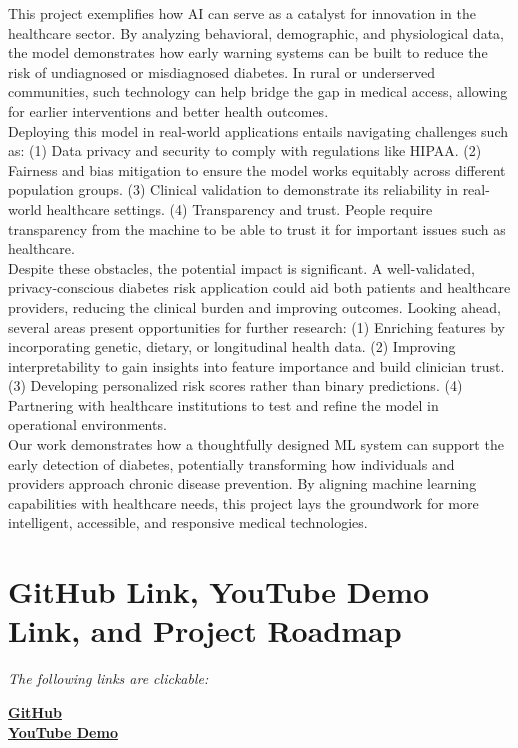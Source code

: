 \documentclass[conference]{IEEEtran}
\begin{document}
This project exemplifies how AI can serve as a catalyst for innovation in the healthcare sector. By analyzing behavioral, demographic, and physiological data, the model demonstrates how early warning systems can be built to reduce the risk of undiagnosed or misdiagnosed diabetes. In rural or underserved communities, such technology can help bridge the gap in medical access, allowing for earlier interventions and better health outcomes. \\

Deploying this model in real-world applications entails navigating challenges such as: (1) Data privacy and security to comply with regulations like HIPAA. (2) Fairness and bias mitigation to ensure the model works equitably across different population groups. (3) Clinical validation to demonstrate its reliability in real-world healthcare settings. (4) Transparency and trust. People require transparency from the machine to be able to trust it for important issues such as healthcare. \\

Despite these obstacles, the potential impact is significant. A well-validated, privacy-conscious diabetes risk application could aid both patients and healthcare providers, reducing the clinical burden and improving outcomes. Looking ahead, several areas present opportunities for further research: (1) Enriching features by incorporating genetic, dietary, or longitudinal health data. (2) Improving interpretability to gain insights into feature importance and build clinician trust. (3) Developing personalized risk scores rather than binary predictions. (4) Partnering with healthcare institutions to test and refine the model in operational environments.\\ 

Our work demonstrates how a thoughtfully designed ML system can support the early detection of diabetes, potentially transforming how individuals and providers approach chronic disease prevention. By aligning machine learning capabilities with healthcare needs, this project lays the groundwork for more intelligent, accessible, and responsive medical technologies.

\section{GitHub Link, YouTube Demo Link, and Project Roadmap}

\vspace{1em}
\noindent \textit{The following links are clickable:}
\begin{center}
\href{https://github.com/LJMurphyy/diabetes-risk-predictor.git}{\textbf{GitHub}}\\
\vspace{.5em}
\href{https://youtu.be/A3SVoX7vvxk?feature=shared}{\textbf{YouTube Demo}}
\end{center}
\end{document}
